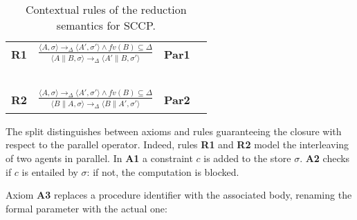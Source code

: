 \documentclass{llncs}
\newcommand{\rarrow}{\rightarrow}
\begin{document}
\begin{table}  %
   \begin{center}
   \begin{tabular}{llll} 
  \mbox{\bf R1}& $\frac {\displaystyle \langle A,\sigma \rangle \rightarrow_\Delta \langle A', \sigma' \rangle
  \wedge fv(B) \subseteq \Delta} 
  {\displaystyle \begin{array}{l}
                          \langle A\parallel B, \sigma \rangle \rightarrow_\Delta \langle A'\parallel B, \sigma' \rangle
                          \end{array}}$ 
    & \bf{Par1}&
  \\
  & \mbox{   }&\mbox{   }&
  \\
    \mbox{\bf R2}& $\frac {\displaystyle \langle A,\sigma \rangle \rightarrow_\Delta \langle A', \sigma'   \rangle
    	\wedge fv(B) \subseteq \Delta} 
    {\displaystyle 
    	\begin{array}{l} \langle B\parallel A, \sigma \rangle \rightarrow_\Delta \langle B\parallel A', \sigma' \rangle
    	\end{array}}$& \bf{Par2}&
  \end{tabular}
  \end{center}
\caption{Contextual rules of the reduction semantics for SCCP.}
\label{fig:operational2}
\end{table}

The split distinguishes between axioms and rules guaranteeing the closure with respect to the parallel operator. Indeed, rules {\bf  R1}  and {\bf  R2} model the interleaving of two agents in parallel.
%
%
In {\bf A1} a constraint $c$ is added to the store $\sigma$.
%
{\bf A2} checks if $c$ is entailed by  $\sigma$: if not, the computation is blocked.

Axiom {\bf A3} replaces a procedure identifier with the associated body, renaming the formal parameter with the actual one:
%
\end{document}
